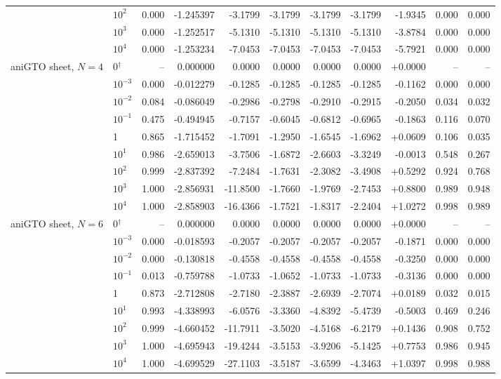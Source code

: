 \begin{tabular}{@{}llr rrrrrr rr@{}}
 & $10^{2}$ & 0.000 & -1.245397 & -3.1799 & -3.1799 & -3.1799 & -3.1799 & -1.9345 & 0.000 & 0.000 \\
 & $10^{3}$ & 0.000 & -1.252517 & -5.1310 & -5.1310 & -5.1310 & -5.1310 & -3.8784 & 0.000 & 0.000 \\
 & $10^{4}$ & 0.000 & -1.253234 & -7.0453 & -7.0453 & -7.0453 & -7.0453 & -5.7921 & 0.000 & 0.000 \\
\addlinespace
aniGTO sheet, $N=4$ & 0$^{\dagger}$ & -- & 0.000000 & 0.0000 & 0.0000 & 0.0000 & 0.0000 & +0.0000 & -- & -- \\
 & $10^{-3}$ & 0.000 & -0.012279 & -0.1285 & -0.1285 & -0.1285 & -0.1285 & -0.1162 & 0.000 & 0.000 \\
 & $10^{-2}$ & 0.084 & -0.086049 & -0.2986 & -0.2798 & -0.2910 & -0.2915 & -0.2050 & 0.034 & 0.032 \\
 & $10^{-1}$ & 0.475 & -0.494945 & -0.7157 & -0.6045 & -0.6812 & -0.6965 & -0.1863 & 0.116 & 0.070 \\
 & 1 & 0.865 & -1.715452 & -1.7091 & -1.2950 & -1.6545 & -1.6962 & +0.0609 & 0.106 & 0.035 \\
 & $10^{1}$ & 0.986 & -2.659013 & -3.7506 & -1.6872 & -2.6603 & -3.3249 & -0.0013 & 0.548 & 0.267 \\
 & $10^{2}$ & 0.999 & -2.837392 & -7.2484 & -1.7631 & -2.3082 & -3.4908 & +0.5292 & 0.924 & 0.768 \\
 & $10^{3}$ & 1.000 & -2.856931 & -11.8500 & -1.7660 & -1.9769 & -2.7453 & +0.8800 & 0.989 & 0.948 \\
 & $10^{4}$ & 1.000 & -2.858903 & -16.4366 & -1.7521 & -1.8317 & -2.2404 & +1.0272 & 0.998 & 0.989 \\
\addlinespace
aniGTO sheet, $N=6$ & 0$^{\dagger}$ & -- & 0.000000 & 0.0000 & 0.0000 & 0.0000 & 0.0000 & +0.0000 & -- & -- \\
 & $10^{-3}$ & 0.000 & -0.018593 & -0.2057 & -0.2057 & -0.2057 & -0.2057 & -0.1871 & 0.000 & 0.000 \\
 & $10^{-2}$ & 0.000 & -0.130818 & -0.4558 & -0.4558 & -0.4558 & -0.4558 & -0.3250 & 0.000 & 0.000 \\
 & $10^{-1}$ & 0.013 & -0.759788 & -1.0733 & -1.0652 & -1.0733 & -1.0733 & -0.3136 & 0.000 & 0.000 \\
 & 1 & 0.873 & -2.712808 & -2.7180 & -2.3887 & -2.6939 & -2.7074 & +0.0189 & 0.032 & 0.015 \\
 & $10^{1}$ & 0.993 & -4.338993 & -6.0576 & -3.3360 & -4.8392 & -5.4739 & -0.5003 & 0.469 & 0.246 \\
 & $10^{2}$ & 0.999 & -4.660452 & -11.7911 & -3.5020 & -4.5168 & -6.2179 & +0.1436 & 0.908 & 0.752 \\
 & $10^{3}$ & 1.000 & -4.695943 & -19.4244 & -3.5153 & -3.9206 & -5.1425 & +0.7753 & 0.986 & 0.945 \\
 & $10^{4}$ & 1.000 & -4.699529 & -27.1103 & -3.5187 & -3.6599 & -4.3463 & +1.0397 & 0.998 & 0.988 \\
\bottomrule
\end{tabular}
